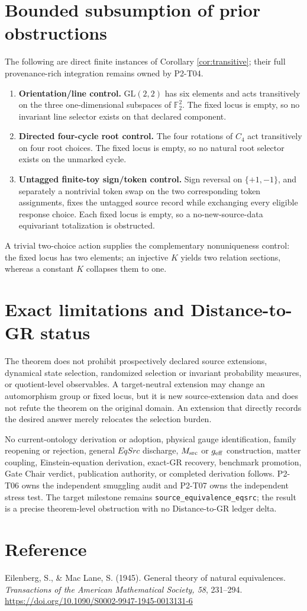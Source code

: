 \documentclass[11pt]{article}
\theoremstyle{definition}
\begin{document}
\section{Bounded subsumption of prior obstructions}

The following are direct finite instances of Corollary
\ref{cor:transitive}; their full provenance-rich integration remains owned by
P2-T04.
\begin{enumerate}
  \item \textbf{Orientation/line control.} \(\mathrm{GL}(2,2)\) has six
        elements and acts transitively on the three one-dimensional subspaces
        of \(\mathbb F_2^2\). The fixed locus is empty, so no invariant line
        selector exists on that declared component.
  \item \textbf{Directed four-cycle root control.} The four rotations of
        \(C_4\) act transitively on four root choices. The fixed locus is
        empty, so no natural root selector exists on the unmarked cycle.
  \item \textbf{Untagged finite-toy sign/token control.} Sign reversal on
        \(\{+1,-1\}\), and separately a nontrivial token swap on the two
        corresponding token assignments, fixes the untagged source record
        while exchanging every eligible response choice. Each fixed locus is
        empty, so a no-new-source-data equivariant totalization is obstructed.
\end{enumerate}
A trivial two-choice action supplies the complementary nonuniqueness control:
the fixed locus has two elements; an injective \(K\) yields two relation
sections, whereas a constant \(K\) collapses them to one.

\section{Exact limitations and Distance-to-GR status}

The theorem does not prohibit prospectively declared source extensions,
dynamical state selection, randomized selection or invariant probability
measures, or quotient-level observables. A target-neutral extension may
change an automorphism group or fixed locus, but it is new source-extension
data and does not refute the theorem on the original domain. An extension
that directly records the desired answer merely relocates the selection
burden.

No current-ontology derivation or adoption, physical gauge identification,
family reopening or rejection, general \(EqSrc\) discharge, \(M_{\rm src}\)
or \(g_{\rm eff}\) construction, matter coupling, Einstein-equation
derivation, exact-GR recovery, benchmark promotion, Gate Chair verdict,
publication authority, or completed derivation follows. P2-T06 owns the
independent smuggling audit and P2-T07 owns the independent stress test.
The target milestone remains \texttt{source\_equivalence\_eqsrc}; the result
is a precise theorem-level obstruction with no Distance-to-GR ledger delta.

\section*{Reference}

Eilenberg, S., \& Mac Lane, S. (1945). General theory of natural
equivalences. \emph{Transactions of the American Mathematical Society, 58},
231--294. \url{https://doi.org/10.1090/S0002-9947-1945-0013131-6}
\end{document}
